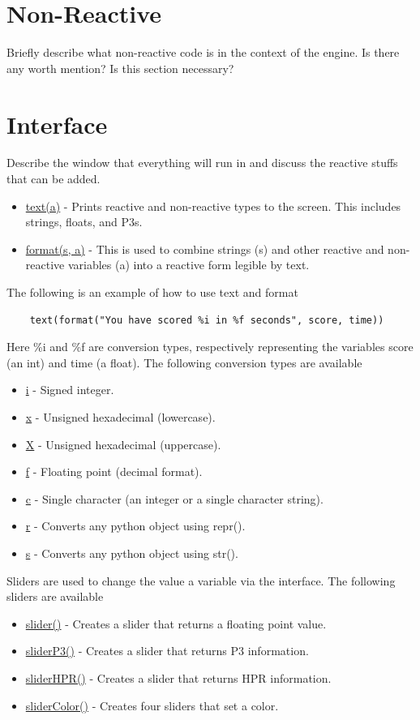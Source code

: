 \documentclass[10pt]{article}
\begin{document}
\section*{Non-Reactive}
Briefly describe what non-reactive code is in the context of the engine. Is there any worth mention? Is this section necessary?



\section*{Interface}
Describe the window that everything will run in and discuss the reactive stuffs that can be added.
\begin{itemize}
    \item \underline{text(a)} - Prints reactive and non-reactive types to the screen. This includes strings, floats, and P3s.
    \item \underline{format(s, a)} - This is used to combine strings (s) and other reactive and non-reactive variables (a) into a reactive form legible by text.
\end{itemize}
The following is an example of how to use text and format
\begin{lstlisting}
    text(format("You have scored %i in %f seconds", score, time))
\end{lstlisting}
Here \%i and \%f are conversion types, respectively representing the variables score (an int) and time (a float).
The following conversion types are available
\begin{itemize}
    \item \underline{i} - Signed integer.
    \item \underline{x} - Unsigned hexadecimal (lowercase).
    \item \underline{X} - Unsigned hexadecimal (uppercase).
    \item \underline{f} - Floating point (decimal format).
    \item \underline{c} - Single character (an integer or a single character string).
    \item \underline{r} - Converts any python object using repr().
    \item \underline{s} - Converts any python object using str().
\end{itemize}
Sliders are used to change the value a variable via the interface.
The following sliders are available
\begin{itemize}
    \item \underline{slider()} - Creates a slider that returns a floating point value.
    \item \underline{sliderP3()} - Creates a slider that returns P3 information.
    \item \underline{sliderHPR()} - Creates a slider that returns HPR information.
    \item \underline{sliderColor()} - Creates four sliders that set a color.
\end{itemize}
\end{document}
